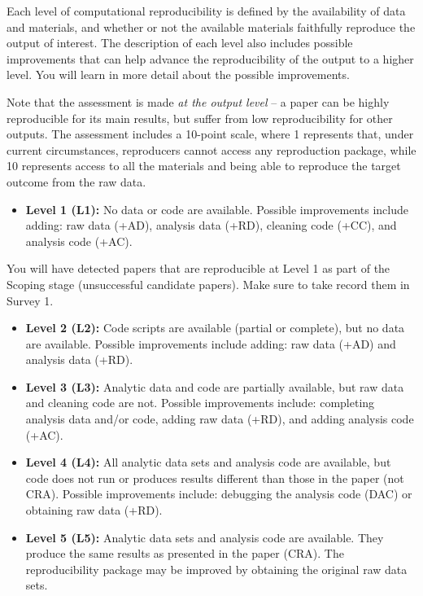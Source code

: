 \documentclass[]{book}
\providecommand{\tightlist}{%
  \setlength{\itemsep}{0pt}\setlength{\parskip}{0pt}}
\begin{document}
Each level of computational reproducibility is defined by the availability of data and materials, and whether or not the available materials faithfully reproduce the output of interest. The description of each level also includes possible improvements that can help advance the reproducibility of the output to a higher level. You will learn in more detail about the possible improvements.

Note that the assessment is made \emph{at the output level} -- a paper can be highly reproducible for its main results, but suffer from low reproducibility for other outputs. The assessment includes a 10-point scale, where 1 represents that, under current circumstances, reproducers cannot access any reproduction package, while 10 represents access to all the materials and being able to reproduce the target outcome from the raw data.

\begin{itemize}
\tightlist
\item
  \textbf{Level 1 (L1):} No data or code are available. Possible improvements include adding: raw data (+AD), analysis data (+RD), cleaning code (+CC), and analysis code (+AC).
\end{itemize}

You will have detected papers that are reproducible at Level 1 as part of the Scoping stage (unsuccessful candidate papers). Make sure to take record them in Survey 1.

\begin{itemize}
\item
  \textbf{Level 2 (L2):} Code scripts are available (partial or complete), but no data are available. Possible improvements include adding: raw data (+AD) and analysis data (+RD).
\item
  \textbf{Level 3 (L3):} Analytic data and code are partially available, but raw data and cleaning code are not. Possible improvements include: completing analysis data and/or code, adding raw data (+RD), and adding analysis code (+AC).
\item
  \textbf{Level 4 (L4):} All analytic data sets and analysis code are available, but code does not run or produces results different than those in the paper (not CRA). Possible improvements include: debugging the analysis code (DAC) or obtaining raw data (+RD).
\item
  \textbf{Level 5 (L5):} Analytic data sets and analysis code are available. They produce the same results as presented in the paper (CRA). The reproducibility package may be improved by obtaining the original raw data sets.
\end{itemize}
\end{document}
